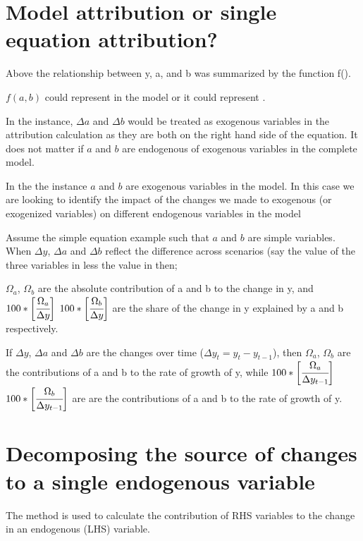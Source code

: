 \documentclass[letterpaper,10pt,english]{jupyterBook}
\begin{document}
\section{Model attribution or  single equation attribution?}
\label{\detokenize{content/06_ModelAnalytics/AttributionSomeFeatures:model-attribution-or-single-equation-attribution}}
\sphinxAtStartPar
Above the relationship between y, a, and b was summarized by the function f().

\sphinxAtStartPar
\(f(a,b)\) could represent  in the model or it could represent .

\sphinxAtStartPar
In the  instance, \(\Delta a\) and \(\Delta b\) would be treated as exogenous variables in the attribution calculation as they are both on the right hand side of the equation. It does not matter if \(a\) and \(b\) are endogenous of exogenous variables in the complete model.

\sphinxAtStartPar
In the the  instance \(a\) and \(b\) are exogenous variables in the model. In this case we are looking to identify the impact of the changes we made to exogenous (or exogenized variables) on different endogenous variables in the model

\sphinxAtStartPar
Assume the simple equation example such that  \(a\) and \(b\) are simple variables. When \(\Delta y\), \(\Delta a\) and \(\Delta b\) reflect the difference across scenarios (say the value of the three variables in  less the value in  then;

\sphinxAtStartPar
\(\Omega_a\), \(\Omega_b\) are the absolute contribution of a and b to the change in y, and
\(100*\bigg[\cfrac{\Omega_a}{\Delta y}\bigg]\)  \(100*\bigg[\cfrac{\Omega_b}{\Delta y}\bigg]\) are the share of the change in y explained by a and b respectively.

\sphinxAtStartPar
If \(\Delta y\), \(\Delta a\) and \(\Delta b\) are the changes over time (\(\Delta y_t=y_t-y_{t-1}\)), then \(\Omega_a\), \(\Omega_b\) are the contributions of a and b to the rate of growth of y, while \(100*\bigg[\cfrac{\Omega_a}{\Delta y_{t-1}}\bigg]\)  \(100*\bigg[\cfrac{\Omega_b}{\Delta y_{t-1}}\bigg]\) are are the contributions of a and b to the rate of growth of y.


\section{Decomposing the source of changes to a single endogenous variable}
\label{\detokenize{content/06_ModelAnalytics/AttributionSomeFeatures:decomposing-the-source-of-changes-to-a-single-endogenous-variable}}
\sphinxAtStartPar
The  method  is used to calculate the contribution of RHS variables to the change in an endogenous (LHS) variable.
\end{document}
